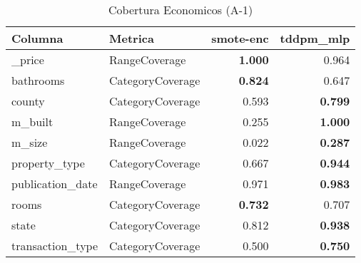 \begin{table}[H]
\centering
\caption{Cobertura Economicos (A-1)}
\label{table-coverage-economicos-a-1}
\begin{tabular}{|l|l|r|r|}
\hline
\rowcolor[gray]{0.8}
Columna & Metrica & smote-enc & tddpm\_mlp \\
\hline \_price & RangeCoverage & \bfseries 1.000 & 0.964 \\
\hline bathrooms & CategoryCoverage & \bfseries 0.824 & 0.647 \\
\hline county & CategoryCoverage & 0.593 & \bfseries 0.799 \\
\hline m\_built & RangeCoverage & 0.255 & \bfseries 1.000 \\
\hline m\_size & RangeCoverage & 0.022 & \bfseries 0.287 \\
\hline property\_type & CategoryCoverage & 0.667 & \bfseries 0.944 \\
\hline publication\_date & RangeCoverage & 0.971 & \bfseries 0.983 \\
\hline rooms & CategoryCoverage & \bfseries 0.732 & 0.707 \\
\hline state & CategoryCoverage & 0.812 & \bfseries 0.938 \\
\hline transaction\_type & CategoryCoverage & 0.500 & \bfseries 0.750 \\
\hline
\end{tabular}
\end{table}
